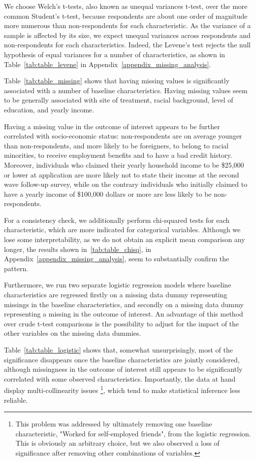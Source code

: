 We choose Welch's t-tests, also known as unequal variances t-test, over the more common Student's t-test, because respondents are about one order of magnitude more numerous than non-respondents for each characteristic. As the variance of a sample is affected by its size, we expect unequal variances across respondents and non-respondents for each characteristics. Indeed, the Levene's test rejects the null hypothesis of equal variances for a number of characteristics, as shown in Table~\ref{tab:table_levene} in Appendix~\ref{appendix_missing_analysis}.

Table~\ref{tab:table_missing} shows that having missing values is significantly associated with a number of baseline characteristics. Having missing values seem to be generally associated with site of treatment, racial background, level of education, and yearly income.

Having a missing value in the outcome of interest appears to be further correlated with socio-economic status: non-respondents are on average younger than non-respondents, and more likely to be foreigners, to belong to racial minorities, to receive employment benefits and to have a bad credit history. Moreover, individuals who claimed their yearly household income to be \$25,000 or lower at application are more likely not to state their income at the second wave follow-up survey, while on the contrary individuals who initially claimed to have a yearly income of \$100,000 dollars or more are less likely to be non-respondents.

For a consistency check, we additionally perform chi-squared tests for each characteristic, which are more indicated for categorical variables. Although we lose some interpretability, as we do not obtain an explicit mean comparison any longer, the results shown in~\ref{tab:table_chisq}, in Appendix~\ref{appendix_missing_analysis}, seem to substantially confirm the pattern.

Furthermore, we run two separate logistic regression models where baseline characteristics are regressed firstly on a missing data dummy representing missings in the baseline characteristics, and secondly on a missing data dummy representing a missing in the outcome of interest. An advantage of this method over crude t-test comparisons is the possibility to adjust for the impact of the other variables on the missing data dummies.

Table~\ref{tab:table_logistic} shows that, somewhat unsurprisingly, most of the significance disappears once the baseline characteristics are jointly considered, although missingness in the outcome of interest still appears to be significantly correlated with some observed characteristics. Importantly, the data at hand display multi-collinearity issues \footnote{This problem was addressed by ultimately removing one baseline characteristic, "Worked for self-employed friends", from the logistic regression. This is obviously an arbitrary choice, but we also observed a loss of significance after removing other combinations of variables.}, which tend to make statistical inference less reliable.

